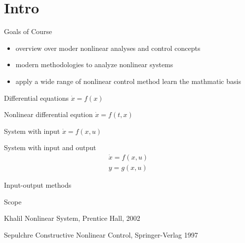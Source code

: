 \section{Intro}

Goals of Course

\begin{itemize}
\item overview over moder nonlinear analyses and control concepts
\item modern methodologies to analyze nonlinear systems
\item apply a wide range of nonlinear control method
learn the mathmatic basis
\end{itemize}


Differential equations $\dot x = f(x)$

Nonlinear differential eqution $\dot x = f(t,x)$

System with input $\dot x = f(x,u)$

System with input and output 
\begin{multline} 
\dot x=f(x,u) \\ y=g(x,u) 
\end{multline}

Input-output methods


Scope 
\begin{enumerate}[label={[\arabic*]}]
  \item Khalil Nonlinear System, Prentice Hall, 2002
  \item Sepulchre Constructive Nonlinear Control, Springer-Verlag 1997 
\end{enumerate}

